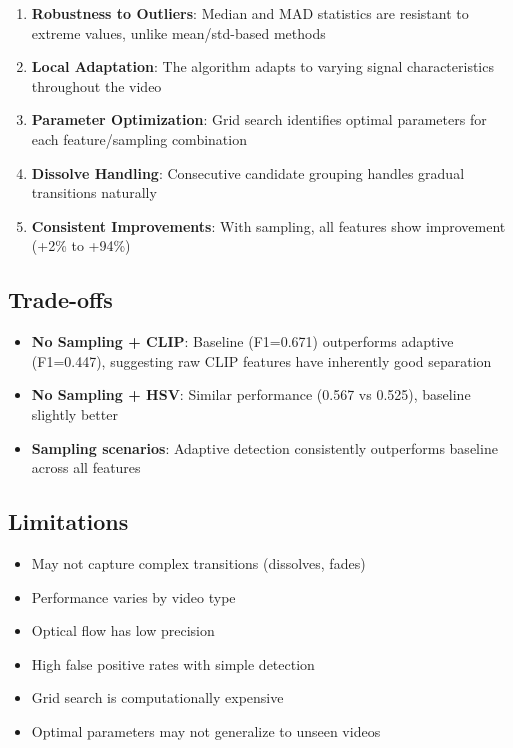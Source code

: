 \documentclass[11pt,a4paper]{article}
\begin{document}
\begin{enumerate}
    \item \textbf{Robustness to Outliers}: Median and MAD statistics are resistant to extreme values, unlike mean/std-based methods
    \item \textbf{Local Adaptation}: The algorithm adapts to varying signal characteristics throughout the video
    \item \textbf{Parameter Optimization}: Grid search identifies optimal parameters for each feature/sampling combination
    \item \textbf{Dissolve Handling}: Consecutive candidate grouping handles gradual transitions naturally
    \item \textbf{Consistent Improvements}: With sampling, all features show improvement (+2\% to +94\%)
\end{enumerate}

\subsection{Trade-offs}

\begin{itemize}
    \item \textbf{No Sampling + CLIP}: Baseline (F1=0.671) outperforms adaptive (F1=0.447), suggesting raw CLIP features have inherently good separation
    \item \textbf{No Sampling + HSV}: Similar performance (0.567 vs 0.525), baseline slightly better
    \item \textbf{Sampling scenarios}: Adaptive detection consistently outperforms baseline across all features
\end{itemize}

\subsection{Limitations}
\begin{itemize}
    \item May not capture complex transitions (dissolves, fades)
    \item Performance varies by video type
    \item Optical flow has low precision
    \item High false positive rates with simple detection
    \item Grid search is computationally expensive
    \item Optimal parameters may not generalize to unseen videos
\end{itemize}
\end{document}
